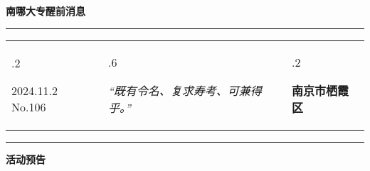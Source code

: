 \documentclass[letterpaper, 12pt]{article}
\begin{document}
\begin{center}
    \Huge\textbf{南哪大专醒前消息}
\end{center}
\vspace{4mm}
\hrule
\renewcommand\tabularxcolumn[1]{m{#1}}
\begin{tabularx}{\textwidth}{>{\hsize.2\hsize}X>{\hsize.6\hsize}X>{\hsize.2\hsize}X}
    \begin{flushleft}
        2024.11.2\, No.106
    \end{flushleft}
    &
    \begin{center}
        \textit{“既有令名、复求寿考、可兼得乎。”}
    \end{center}
    &
    \begin{flushright}
        \textbf{南京市栖霞区}
    \end{flushright}
\end{tabularx}
\vspace{-3.5mm}
\hrule
\vspace{4mm}
\centerline{\huge\textbf{活动预告}}
\end{document}

